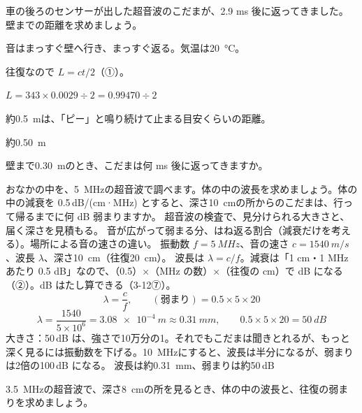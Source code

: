 \begin{reidai}[車の障害物センサー]
\label{ph:波-10:ex2}車の後ろのセンサーが出した超音波のこだまが、2.9 ms 後に返ってきました。壁までの距離を求めましょう。
\par{} 音はまっすぐ壁へ行き、まっすぐ返る。気温は\qty{20}{\celsius}。
\par\kangaekata 往復なので $L=ct/2$（①）。
\par\shiki $L=343\times0.0029\div2=0.99470\div2$
\par{} 約\qty{0.5}{m}は、「ピー」と鳴り続けて止まる目安くらいの距離。
\par\kotae 約\qty{0.50}{m}
\end{reidai}
\begin{jibun}
壁まで\qty{0.30}{m}のとき、こだまは何 ms 後に返ってきますか。
\end{jibun}

\begin{phreidai}[おなかの中を見る超音波の振動数]
\label{ph:波-10:ex3}おなかの中を、\qty{5}{MHz}の超音波で調べます。体の中の波長を求めましょう。体の中の減衰を 0.5\,dB/(cm·MHz) とすると、深さ\qty{10}{cm}の所からのこだまは、行って帰るまでに何 dB 弱まりますか。
\phbamen
超音波の検査で、見分けられる大きさと、届く深さを見積もる。
\phmushi
音が広がって弱まる分、はね返る割合（減衰だけを考える）。場所による音の速さの違い。
\phzu
振動数 $f=\qty{5}{MHz}$、音の速さ $c=\qty{1540}{m/s}$、波長 $\lambda$、深さ\qty{10}{cm}（往復\qty{20}{cm}）。
\phriyu
波長は $\lambda=c/f$。減衰は「1 cm・1 MHz あたり 0.5 dB」なので、（0.5）×（MHz の数）×（往復の cm）で dB になる（②）。dB はたし算できる（3-12⑦）。
\phtateru
\[ \lambda=\frac{c}{f},\qquad (\text{弱まり})=0.5\times5\times20 \]
\phtoku
\[ \lambda=\frac{1540}{5\times10^6}=\qty{3.08e-4}{m}\approx\qty{0.31}{mm},\qquad 0.5\times5\times20=\qty{50}{dB} \]
\phtashikame
大きさ：50\,dB は、強さで10万分の1。それでもこだまは聞きとれるが、もっと深く見るには振動数を下げる。\qty{10}{MHz}にすると、波長は半分になるが、弱まりは2倍の100\,dB になる。
\kotae 波長は約\qty{0.31}{mm}、弱まりは約50\,dB
\end{phreidai}
\begin{jibun}
\qty{3.5}{MHz}の超音波で、深さ\qty{8}{cm}の所を見るとき、体の中の波長と、往復の弱まりを求めましょう。
\end{jibun}

